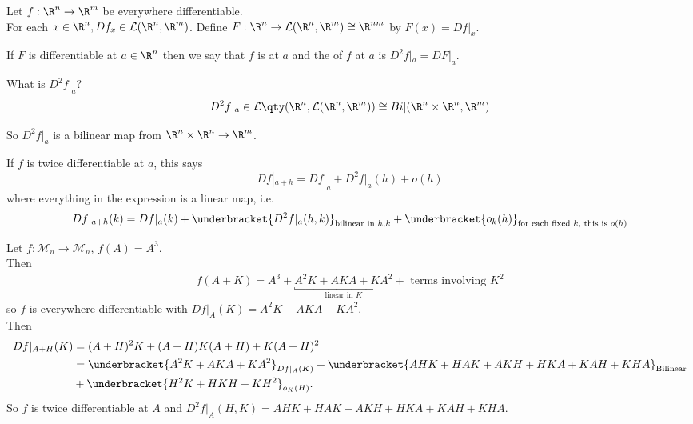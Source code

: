 \begin{definition}
Let $f:\R^n\to \R^m$ be everywhere differentiable. \\
For each $x\in \R^n, Df_x\in \mathcal{L}(\R^n,\R^m)$. 
Define $F: \R^n\to\mathcal{L}(\R^n,\R^m) \cong \R^{nm}$ by $F(x) = Df|_x$.

If $F$ is differentiable at $a \in \R^n$ then we say that $f$ is  at $a$ and the  of $f$ at $a$ is $D^2f|_a = DF|_a$. \\
\end{definition}

What is $D^2 f|_a$?
\begin{align*}
    D^2f|_a\in \mathcal{L} \qty(\R^n, \mathcal{L}(\R^n,\R^m)) \cong Bi|(\R^n\times\R^n, \R^m)
\end{align*} 

So $D^2f|_a$ is a bilinear map from $\R^n\times\R^n \to \R^m$.

If $f$ is twice differentiable at $a$, this says \[ Df|_{a+h} = Df|_a + D^2f|_a(h) + o(h) \]
where everything in the expression is a linear map, i.e. \begin{align*}
    Df|_{a+h}(k) = Df|_a(k) + \underbracket{D^2 f|_a(h,k)}_{\textup{bilinear in }h,k} + \underbracket{o_k(h)}_{\textup{for each fixed }k, \textup{ this is }o(h)}
\end{align*}

\begin{example}
    Let $f: \mathcal{M}_n\to\mathcal{M}_n$, $f(A) = A^3$. \\
    Then \begin{align*}
        f(A+K) = A^3 + \underbracket{A^2K + AKA + KA^2}_{\text{linear in }K} + \text{ terms involving $K^2$}
    \end{align*} so $f$ is everywhere differentiable with $Df|_A(K) =  A^2K + AKA + KA^2$. \\
    Then
    \begin{align*}
        Df|_{A+H}(K) &= (A+H)^2 K + (A+H)K(A+H) + K(A+H)^2 \\
        &= \underbracket{A^2K + AKA + KA^2}_{Df|_A(K)} + \underbracket{AHK+HAK+AKH+HKA+KAH+KHA}_{\textup{Bilinear}} \\
        &+ \underbracket{H^2K+HKH+KH^2}_{o_K(H)}.
    \end{align*}
    So $f$ is twice differentiable at $A$ and $D^2f|_A(H,K) = AHK+HAK+AKH+HKA+KAH+KHA$.
\end{example}


